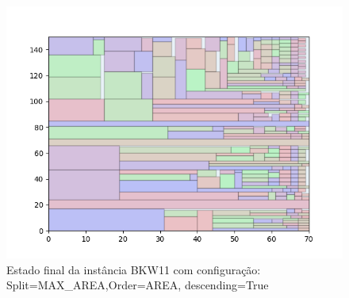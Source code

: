 \begin{figure}[H]
    \centering
    \caption[]{Estado final da instância BKW11 com configuração: Split=MAX_AREA,Order=AREA, descending=True}
    \label{fig:bkw11-max_area-area-true}
    \includegraphics[scale=0.5]{output/figures/bkw/bkw11/max_area/area/true/000}
\end{figure}